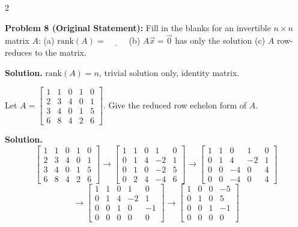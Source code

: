 \documentclass[8pt]{extarticle}
\begin{document}
\begin{multicols}{2}
\begin{tcolorbox}[title=]
\noindent
\textbf{Problem 8 (Original Statement):}
Fill in the blanks for an invertible \(n\times n\) matrix \(A\):  
(a) \(\mathrm{rank}(A)=\underline{\hspace{1cm}}\) \quad
(b) \(A\vec x=\vec 0\) has only the \underline{\hspace{1.6cm}} solution \quad
(c) \(A\) row-reduces to the \underline{\hspace{1.6cm}} matrix.

\textbf{Solution.}
\(\mathrm{rank}(A)=n\), \; trivial solution only,\; identity matrix.
\end{tcolorbox}

\begin{tcolorbox}[title=]
\noindent
Let
\(
A=\begin{bmatrix}
1&1&0&1&0\\
2&3&4&0&1\\
3&4&0&1&5\\
6&8&4&2&6
\end{bmatrix}.
\)
Give the reduced row echelon form of \(A\).

\textbf{Solution.}
\[
\begin{bmatrix}
1&1&0&1&0\\
2&3&4&0&1\\
3&4&0&1&5\\
6&8&4&2&6
\end{bmatrix}
\to
\begin{bmatrix}
1&1&0&1&0\\
0&1&4&-2&1\\
0&1&0&-2&5\\
0&2&4&-4&6
\end{bmatrix}
\to
\begin{bmatrix}
1&1&0&1&0\\
0&1&4&-2&1\\
0&0&-4&0&4\\
0&0&-4&0&4
\end{bmatrix}
\]
\[
\to
\begin{bmatrix}
1&1&0&1&0\\
0&1&4&-2&1\\
0&0&1&0&-1\\
0&0&0&0&0
\end{bmatrix}
\to
\boxed{
\begin{bmatrix}
1&0&0&-5\\
0&1&0&5\\
0&0&1&-1\\
0&0&0&0
\end{bmatrix}}
\]
\end{tcolorbox}


\end{multicols}
\end{document}
